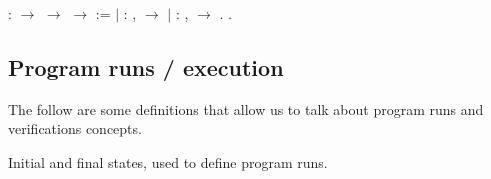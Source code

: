 \documentclass[12pt]{report}
\begin{document}
\begin{coqdoccode}
\coqdocindent{2.00em}
  :  \ensuremath{\rightarrow}  \ensuremath{\rightarrow}  \ensuremath{\rightarrow}  :=\coqdoceol
\coqdocindent{3.00em}
\ensuremath{|}  : \coqdockw{\ensuremath{\forall}}   ,\coqdoceol
\coqdocindent{5.00em}
    \ensuremath{\rightarrow}\coqdoceol
\coqdocindent{5.00em}
   \coqdoceol
\coqdocindent{3.00em}
\ensuremath{|}  : \coqdockw{\ensuremath{\forall}}   ,\coqdoceol
\coqdocindent{5.00em}
    \ensuremath{\rightarrow}\coqdoceol
\coqdocindent{5.00em}
   .\coqdoceol
\coqdocemptyline
\coqdocindent{1.00em}
     .\coqdoceol
\coqdocemptyline
\end{coqdoccode}
\subsection{Program runs / execution}




        The follow are some definitions that allow us to
        talk about program runs and verifications concepts.


  

 Initial and final states, used to define program runs.
    
\end{document}
